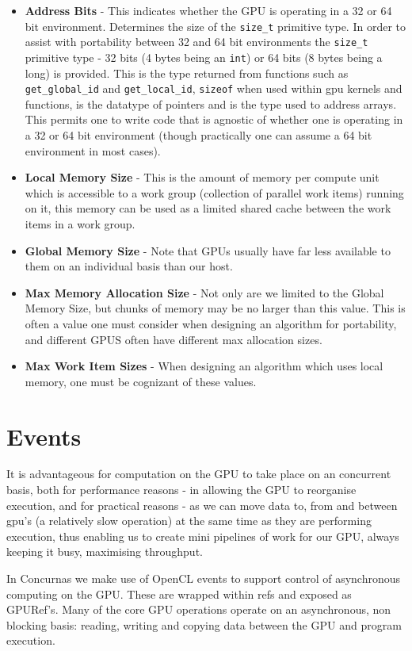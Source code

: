 \documentclass[conc-doc]{subfiles}
\begin{document}
\begin{itemize}
	\item \textbf{Address Bits} - This indicates whether the GPU is operating in a 32 or 64 bit environment. Determines the size of the \lstinline{size_t} primitive type. In order to assist with portability between 32 and 64 bit environments the \lstinline{size_t} primitive type - 32 bits (4 bytes being an \lstinline{int}) or 64 bits (8 bytes being a long) is provided. This is the type returned from functions such as \lstinline{get_global_id} and \lstinline{get_local_id}, \lstinline{sizeof} when used within gpu kernels and functions, is the datatype of pointers and is the type used to address arrays. This permits one to write code that is agnostic of whether one is operating in a 32 or 64 bit environment (though practically one can assume a 64 bit environment in most cases).
	\item \textbf{Local Memory Size} - This is the amount of memory per compute unit which is accessible to a work group (collection of parallel work items) running on it, this memory can be used as a limited shared cache between the work items in a work group.
	\item \textbf{Global Memory Size} - Note that GPUs usually have far less available to them on an individual basis than our host.
	\item \textbf{Max Memory Allocation Size} - Not only are we limited to the Global Memory Size, but chunks of memory may be no larger than this value. This is often a value one must consider when designing an algorithm for portability, and different GPUS often have different max allocation sizes.
	\item \textbf{Max Work Item Sizes} - When designing an algorithm which uses local memory, one must be cognizant of these values.
\end{itemize}

\section{Events}
It is advantageous for computation on the GPU to take place on an concurrent basis, both for performance reasons - in allowing the GPU to reorganise execution, and for practical reasons - as we can move data to, from and between gpu's (a relatively slow operation) at the same time as they are performing execution, thus enabling us to create mini pipelines of work for our GPU, always keeping it busy, maximising throughput.

In Concurnas we make use of OpenCL events to support control of asynchronous computing on the GPU. These are wrapped within refs and exposed as GPURef's. Many of the core GPU operations operate on an asynchronous, non blocking basis: reading, writing and copying data between the GPU and program execution.
\end{document}
